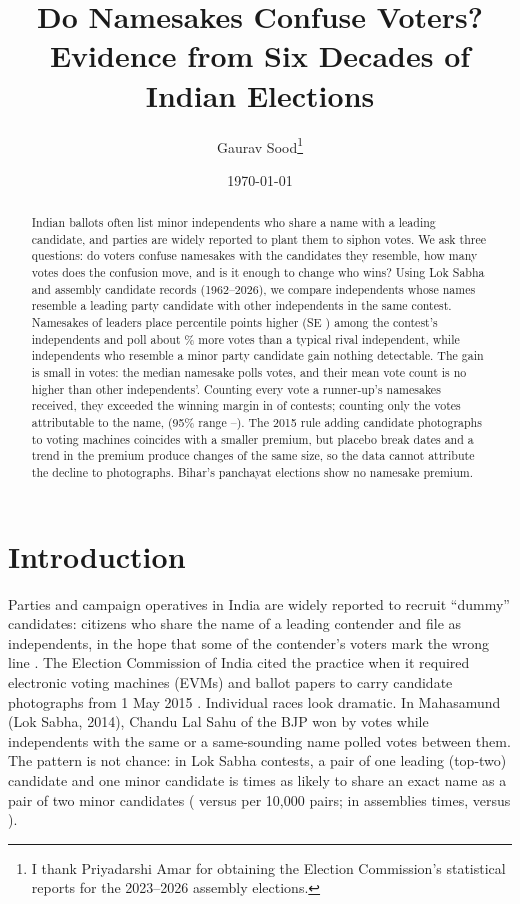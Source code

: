 \documentclass[11pt]{article}
\title{Do Namesakes Confuse Voters? Evidence from Six Decades of Indian Elections}
\author{Gaurav Sood\thanks{I thank Priyadarshi Amar for obtaining the Election Commission's statistical reports for the 2023--2026 assembly elections.}}
\date{\today}
\begin{document}
\maketitle

\begin{abstract}
\noindent Indian ballots often list minor independents who share a name with a leading candidate, and parties are widely reported to plant them to siphon votes. We ask three questions: do voters confuse namesakes with the candidates they resemble, how many votes does the confusion move, and is it enough to change who wins? Using \nTcpdCand{} Lok Sabha and assembly candidate records (1962--2026), we compare independents whose names resemble a leading party candidate with other independents in the same contest. Namesakes of leaders place \rkExact{} percentile points higher (SE \rkExactSe) among the contest's independents and poll about \lgExactPct\% more votes than a typical rival independent, while independents who resemble a minor party candidate gain nothing detectable. The gain is small in votes: the median namesake polls \medNamesakeVotes{} votes, and their mean vote count is no higher than other independents'. Counting every vote a runner-up's namesakes received, they exceeded the winning margin in \ovLookBound{} of \nMarginContests{} contests; counting only the votes attributable to the name, \ovLookPoint{} (95\% range \ovLookLow--\ovLookHigh). The 2015 rule adding candidate photographs to voting machines coincides with a smaller premium, but placebo break dates and a trend in the premium produce changes of the same size, so the data cannot attribute the decline to photographs. Bihar's panchayat elections show no namesake premium.
\end{abstract}

\section{Introduction}

Parties and campaign operatives in India are widely reported to recruit ``dummy'' candidates: citizens who share the name of a leading contender and file as independents, in the hope that some of the contender's voters mark the wrong line \citep{factly2019, diplomat2020}. The Election Commission of India cited the practice when it required electronic voting machines (EVMs) and ballot papers to carry candidate photographs from 1 May 2015 \citep{businessstandard2015}. Individual races look dramatic. In Mahasamund (Lok Sabha, 2014), Chandu Lal Sahu of the BJP won by \mahaMargin{} votes while \mahaN{} independents with the same or a same-sounding name polled \mahaVotes{} votes between them. The pattern is not chance: in Lok Sabha contests, a pair of one leading (top-two) candidate and one minor candidate is \lsLeaderRatio{} times as likely to share an exact name as a pair of two minor candidates (\lsLeaderExact{} versus \lsMinorExact{} per 10,000 pairs; in assemblies \aeLeaderRatio{} times, \aeLeaderExact{} versus \aeMinorExact{}).
\end{document}
